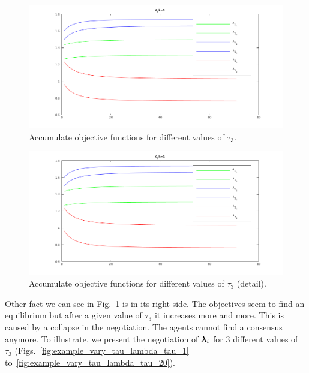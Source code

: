 \documentclass[../main.tex]{subfiles}
\begin{document}
\begin{figure}[h]
  \centering
  \includegraphics[width=.5\textwidth]{../img/example_theta.png}
  \caption{Accumulate objective functions for different values of $\tau_{3}$. }\label{fig:example_vary_tau_objective}
\end{figure}

\begin{figure}[h]
  \centering
  \includegraphics[width=.5\textwidth]{../img/example_theta.png}
  \caption{Accumulate objective functions for different values of $\tau_{3}$ (detail). }\label{fig:example_vary_tau_objective_detail}
\end{figure}

Other fact we can see in Fig.~\ref{fig:example_vary_tau_objective} is in its right side. The objectives seem to find an equilibrium but after a given value of $\tau_{3}$ it increases more and more.
This is caused by a collapse in the negotiation.
The agents cannot find a consensus anymore.
To illustrate, we present the negotiation of $\boldsymbol{\lambda}_i$ for $3$ different values of $\tau_{3}$ (Figs.~\ref{fig:example_vary_tau_lambda_tau_1} to~\ref{fig:example_vary_tau_lambda_tau_20}).
\end{document}
